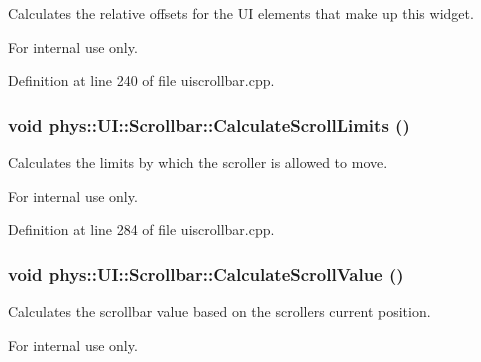 Calculates the relative offsets for the UI elements that make up this widget. 

\begin{DoxyInternal}{For internal use only.}
\end{DoxyInternal}


Definition at line 240 of file uiscrollbar.cpp.

\hypertarget{classphys_1_1UI_1_1Scrollbar_aa59e2c0662ac13fac037164c86f829f5}{
\subsubsection[{CalculateScrollLimits}]{\setlength{\rightskip}{0pt plus 5cm}void phys::UI::Scrollbar::CalculateScrollLimits ()}}
\label{d0/d3e/classphys_1_1UI_1_1Scrollbar_aa59e2c0662ac13fac037164c86f829f5}


Calculates the limits by which the scroller is allowed to move. 

\begin{DoxyInternal}{For internal use only.}
\end{DoxyInternal}


Definition at line 284 of file uiscrollbar.cpp.

\hypertarget{classphys_1_1UI_1_1Scrollbar_afc9eb290c8dcf3935e2b3046063989e9}{
\subsubsection[{CalculateScrollValue}]{\setlength{\rightskip}{0pt plus 5cm}void phys::UI::Scrollbar::CalculateScrollValue ()}}
\label{d0/d3e/classphys_1_1UI_1_1Scrollbar_afc9eb290c8dcf3935e2b3046063989e9}


Calculates the scrollbar value based on the scrollers current position. 

\begin{DoxyInternal}{For internal use only.}
\end{DoxyInternal}


